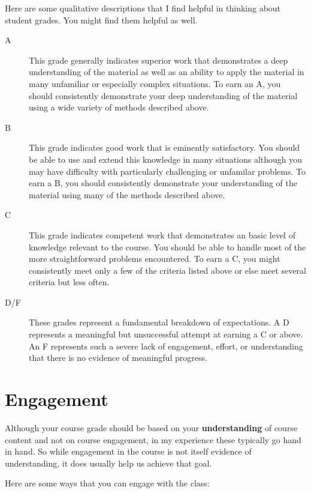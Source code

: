 \documentclass[
  letterpaper,
  DIV=11,
  numbers=noendperiod]{scrreprt}
\begin{document}
Here are some qualitative descriptions that I find helpful in thinking
about student grades. You might find them helpful as well.

\begin{description}
\item[A]
This grade generally indicates superior work that demonstrates a deep
understanding of the material as well as an ability to apply the
material in many unfamiliar or especially complex situations. To earn an
A, you should consistently demonstrate your deep understanding of the
material using a wide variety of methods described above.
\item[B]
This grade indicates good work that is eminently satisfactory. You
should be able to use and extend this knowledge in many situations
although you may have difficulty with particularly challenging or
unfamilar problems. To earn a B, you should consistently demonstrate
your understanding of the material using many of the methods described
above.
\item[C]
This grade indicates competent work that demonstrates an basic level of
knowledge relevant to the course. You should be able to handle most of
the more straightforward problems encountered. To earn a C, you might
consistently meet only a few of the criteria listed above or else meet
several criteria but less often.
\item[D/F]
These grades represent a fundamental breakdown of expectations. A D
represents a meaningful but unsuccessful attempt at earning a C or
above. An F represents such a severe lack of engagement, effort, or
understanding that there is no evidence of meaningful progress.
\end{description}

\section*{Engagement}\label{engagement}


Although your course grade should be based on your
\textbf{understanding} of course content and not on course engagement,
in my experience these typically go hand in hand. So while engagement in
the course is not itself evidence of understanding, it does usually help
us achieve that goal.

Here are some ways that you can engage with the class:
\end{document}
